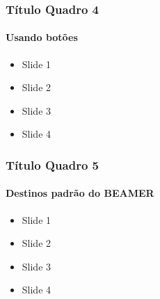 \documentclass{beamer}
\begin{document}
\begin{frame}
	\frametitle{Título Quadro 4}
	\framesubtitle{Usando botões}
	
	\begin{itemize}
		\item<1-> Slide 1
		\item<2-> Slide 2
		\item<3-> Slide 3
		\item<4-> Slide 4
	\end{itemize}
	
		\hyperlink{segundo-slide-quadro1}{}
		
		\hyperlink{segundo-slide-quadro1}{}
		
		\hyperlink{segundo-slide-quadro1}{}
		
		\hyperlink{segundo-slide-quadro1}{}
		
\end{frame}

\begin{frame}
	\frametitle{Título Quadro 5}
	\framesubtitle{Destinos padrão do BEAMER}
	
	\begin{itemize}
		\item<1-> Slide 1
		\item<2-> Slide 2
		\item<3-> Slide 3
		\item<4-> Slide 4
	\end{itemize}
	
	
	
	
	
	
	
	
	
	
	
	
\end{frame}
\end{document}
